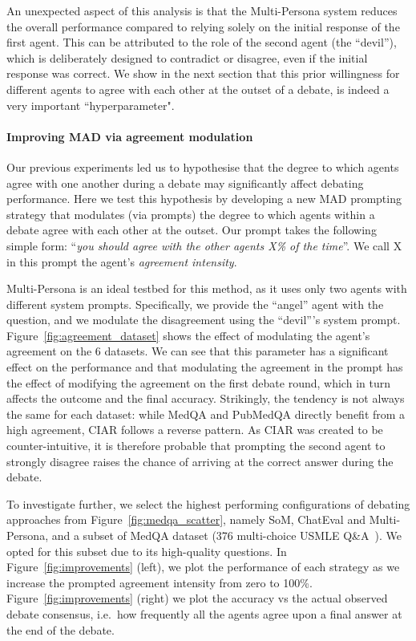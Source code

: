 \documentclass{article}  %
\begin{document}
An unexpected aspect of this analysis is that the Multi-Persona system reduces the overall performance compared to relying solely on the initial response of the first agent. This can be attributed to the role of the second agent (the ``devil''), which is deliberately designed to contradict or disagree, even if the initial response was correct. We show in the next section that this prior willingness for different agents to agree with each other at the outset of a debate, is indeed a very important ``hyperparameter". 

\paragraph{Improving MAD via agreement modulation}\label{sec:agreement_modulation}
Our previous experiments led us to hypothesise that the degree to which agents agree with one another during a debate may significantly affect debating performance. 
Here we test this hypothesis by developing a new MAD prompting strategy that modulates (via prompts) the degree to which agents within a debate agree with each other at the outset. Our prompt takes the following simple form: ``\textit{you should agree with the other agents X\% of the time}''. We call X in this prompt the agent's \textit{agreement intensity}. 

Multi-Persona is an ideal testbed for this method, as it uses only two agents with different system prompts. Specifically, we provide the ``angel'' agent with the question, and we modulate the disagreement using the ``devil'''s system prompt. Figure~\ref{fig:agreement_dataset} shows the effect of modulating the agent's agreement on the 6 datasets. We can see that this parameter has a significant effect on the performance and that modulating the agreement in the prompt has the effect of modifying the agreement on the first debate round, which in turn affects the outcome and the final accuracy. Strikingly, the tendency is not always the same for each dataset: while MedQA and PubMedQA directly benefit from a high agreement, CIAR follows a reverse pattern. As CIAR was created to be counter-intuitive, it is therefore probable that prompting the second agent to strongly disagree raises the chance of arriving at the correct answer during the debate. 

To investigate further, we select the highest performing configurations of debating approaches from Figure~\ref{fig:medqa_scatter}, namely SoM, ChatEval and Multi-Persona, and a subset of MedQA dataset (376 multi-choice USMLE Q\&A~\citep{han2023medalpaca}). We opted for this subset due to its high-quality questions.
% 
In Figure~\ref{fig:improvements} (left), we plot the performance of each strategy as we increase the prompted agreement intensity from zero to 100\%. 
Figure~\ref{fig:improvements} (right) we plot the accuracy vs the actual observed debate consensus, i.e.\ how frequently all the agents agree upon a final answer at the end of the debate. 
\end{document}
